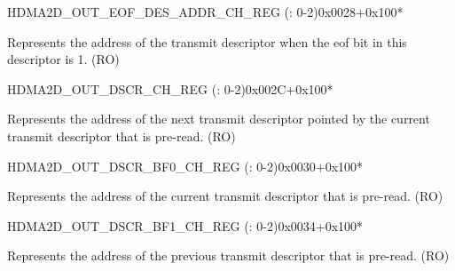 \begin{register}{H}{DMA2D\_OUT\_EOF\_DES\_ADDR\_CH\_REG (: 0-2)}{0x0028+0x100*}\label{regdesc:DMA2DOUTEOFDESADDRCHNREG}
%
\regnewline%
\begin{regdesc}\begin{reglist}
\label{fielddesc:DMA2DOUTEOFDESADDRCHN}\item [DMA2D\_OUT\_EOF\_DES\_ADDR\_CH\regindex{n}] Represents the address of the transmit descriptor when the eof bit in this descriptor is 1. (RO)
\end{reglist}\end{regdesc}
\end{register}


\begin{register}{H}{DMA2D\_OUT\_DSCR\_CH\_REG (: 0-2)}{0x002C+0x100*}\label{regdesc:DMA2DOUTDSCRCHNREG}
%
\regnewline%
\begin{regdesc}\begin{reglist}
\label{fielddesc:DMA2DOUTLINKDSCRCHN}\item [DMA2D\_OUTLINK\_DSCR\_CH\regindex{n}] Represents the address of the next transmit descriptor pointed by the current transmit descriptor that is pre-read. (RO)
\end{reglist}\end{regdesc}
\end{register}


\begin{register}{H}{DMA2D\_OUT\_DSCR\_BF0\_CH\_REG (: 0-2)}{0x0030+0x100*}\label{regdesc:DMA2DOUTDSCRBF0CHNREG}
%
\regnewline%
\begin{regdesc}\begin{reglist}
\label{fielddesc:DMA2DOUTLINKDSCRBF0CHN}\item [DMA2D\_OUTLINK\_DSCR\_BF0\_CH\regindex{n}] Represents the address of the current transmit descriptor that is pre-read. (RO)
\end{reglist}\end{regdesc}
\end{register}


\begin{register}{H}{DMA2D\_OUT\_DSCR\_BF1\_CH\_REG (: 0-2)}{0x0034+0x100*}\label{regdesc:DMA2DOUTDSCRBF1CHNREG}
%
\regnewline%
\begin{regdesc}\begin{reglist}
\label{fielddesc:DMA2DOUTLINKDSCRBF1CHN}\item [DMA2D\_OUTLINK\_DSCR\_BF1\_CH\regindex{n}] Represents the address of the previous transmit descriptor that is pre-read. (RO)
\end{reglist}\end{regdesc}
\end{register}





